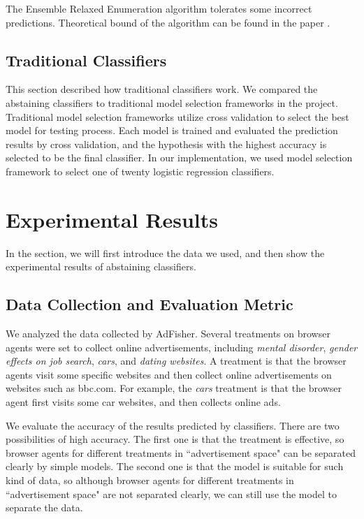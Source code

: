 \documentclass[12pt, journal]{IEEEtran}
\begin{document}
The Ensemble Relaxed Enumeration algorithm tolerates some incorrect predictions. Theoretical bound of the algorithm can be found in the paper \cite{sayedi2010trading}.

\subsection{Traditional Classifiers}
This section described how traditional classifiers work. 
We compared the abstaining classifiers to traditional model selection frameworks in the project.
Traditional model selection frameworks utilize cross validation to select the best model for testing process. 
Each model is trained and evaluated the prediction results by cross validation, and the hypothesis with the highest accuracy is selected to be the final classifier.
In our implementation, we used model selection framework to select one of twenty logistic regression classifiers.

\section{Experimental Results}
In the section, we will first introduce the data we used, and then show the experimental results of abstaining classifiers.
\subsection{Data Collection and Evaluation Metric}
We analyzed the data collected by AdFisher. 
Several treatments on browser agents were set to collect online advertisements, including \textit{mental disorder}, \textit{gender effects on job search}, \textit{cars}, and \textit{dating websites}.
A treatment is that the browser agents visit some specific websites and then collect online advertisements on websites such as bbc.com.
For example, the  \textit{cars} treatment is that the browser agent first visits some car websites, and then collects online ads.

We evaluate the accuracy of the results predicted by classifiers. 
There are two possibilities of high accuracy. The first one is that the treatment is effective, so browser agents for different treatments in ``advertisement space" can be separated clearly by simple models. The second one is that the model is suitable for such kind of data, so although browser agents for different treatments in ``advertisement space" are not separated clearly, we can still use the model to separate the data.
\end{document}
